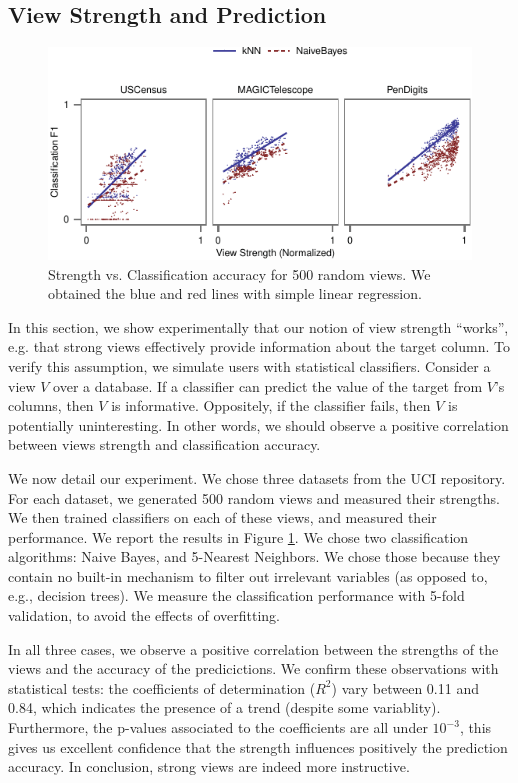 \subsection{View Strength and Prediction}
\label{sec:view-strengh}

\begin{figure}[t!]
\centering
\includegraphics[width=\columnwidth]{plots/compare-strength-f1}
\caption{Strength vs. Classification accuracy for 500 random views. We obtained
    the blue and red lines with simple linear regression.}
\label{pic:strength-vs-f1}
\end{figure}
In this section, we show experimentally that our notion of view strength
``works'', e.g. that strong views effectively provide information about the
target column. To verify this assumption, we simulate users with statistical
classifiers. Consider a view $V$ over a database. If a classifier can predict
the value of the target from $V$'s columns, then $V$ is informative.
Oppositely, if the classifier fails, then $V$ is potentially uninteresting. In
other words, we should observe a positive correlation between views strength
and classification accuracy.

We now detail our experiment. We chose three datasets from the UCI repository.
For each dataset, we generated 500 random views and measured their strengths.
We then trained classifiers on each of these views, and measured their
performance. We report the results in Figure \ref{pic:strength-vs-f1}. We chose
two classification algorithms: Naive Bayes, and 5-Nearest Neighbors.  We chose
those because they contain no built-in mechanism to filter out irrelevant
variables (as opposed to, e.g., decision trees). We measure the classification
performance with 5-fold validation, to avoid the effects of overfitting.

In all three cases, we observe a positive correlation between the strengths of
the views and the accuracy of the predicictions. We confirm these observations
with statistical tests: the coefficients of determination ($R^2$) vary between
0.11 and 0.84, which indicates the presence of a trend (despite some
variablity). Furthermore, the p-values associated to the coefficients are all
under $10^{-3}$, this gives us excellent confidence that the strength
influences positively the prediction accuracy. In conclusion, strong views are
indeed more instructive.


